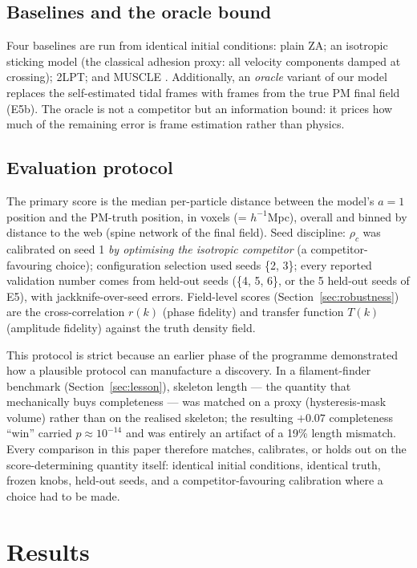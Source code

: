 \documentclass[11pt]{article}
\begin{document}
\subsection{Baselines and the oracle bound}
\label{sec:baselines}

Four baselines are run from identical initial conditions: plain ZA; an isotropic sticking model (the classical adhesion proxy: all velocity components damped at crossing); 2LPT; and MUSCLE \cite{neyrinck2016}. Additionally, an \emph{oracle} variant of our model replaces the self-estimated tidal frames with frames from the true PM final field (E5b). The oracle is not a competitor but an information bound: it prices how much of the remaining error is frame estimation rather than physics.

\subsection{Evaluation protocol}
\label{sec:protocol}

The primary score is the median per-particle distance between the model's $a = 1$ position and the PM-truth position, in voxels (= $h^{-1}$Mpc), overall and binned by distance to the web (spine network of the final field). Seed discipline: $\rho_c$ was calibrated on seed 1 \emph{by optimising the isotropic competitor} (a competitor-favouring choice); configuration selection used seeds \{2, 3\}; every reported validation number comes from held-out seeds (\{4, 5, 6\}, or the 5 held-out seeds of E5), with jackknife-over-seed errors. Field-level scores (Section~\ref{sec:robustness}) are the cross-correlation $r(k)$ (phase fidelity) and transfer function $T(k)$ (amplitude fidelity) against the truth density field.

This protocol is strict because an earlier phase of the programme demonstrated how a plausible protocol can manufacture a discovery. In a filament-finder benchmark (Section~\ref{sec:lesson}), skeleton length --- the quantity that mechanically buys completeness --- was matched on a proxy (hysteresis-mask volume) rather than on the realised skeleton; the resulting $+0.07$ completeness ``win'' carried $p \approx 10^{-14}$ and was entirely an artifact of a 19\% length mismatch. Every comparison in this paper therefore matches, calibrates, or holds out on the score-determining quantity itself: identical initial conditions, identical truth, frozen knobs, held-out seeds, and a competitor-favouring calibration where a choice had to be made.

\section{Results}
\label{sec:results}
\end{document}
